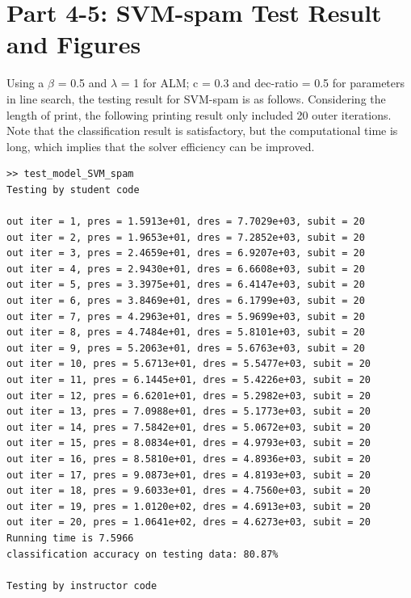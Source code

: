 \documentclass[12pt]{article}
\begin{document}
\section*{Part 4-5: SVM-spam Test Result and Figures}
$$
$$
Using a \(\beta\) = 0.5 and \(\lambda\) = 1 for ALM; c = 0.3 and dec-ratio = 0.5 for parameters in line search, the testing result for SVM-spam is as follows. Considering the length of print, the following printing result only included 20 outer iterations. Note that the classification result is satisfactory, but the computational time is long, which implies that the solver efficiency can be improved.
\begin{verbatim}
>> test_model_SVM_spam
Testing by student code

out iter = 1, pres = 1.5913e+01, dres = 7.7029e+03, subit = 20
out iter = 2, pres = 1.9653e+01, dres = 7.2852e+03, subit = 20
out iter = 3, pres = 2.4659e+01, dres = 6.9207e+03, subit = 20
out iter = 4, pres = 2.9430e+01, dres = 6.6608e+03, subit = 20
out iter = 5, pres = 3.3975e+01, dres = 6.4147e+03, subit = 20
out iter = 6, pres = 3.8469e+01, dres = 6.1799e+03, subit = 20
out iter = 7, pres = 4.2963e+01, dres = 5.9699e+03, subit = 20
out iter = 8, pres = 4.7484e+01, dres = 5.8101e+03, subit = 20
out iter = 9, pres = 5.2063e+01, dres = 5.6763e+03, subit = 20
out iter = 10, pres = 5.6713e+01, dres = 5.5477e+03, subit = 20
out iter = 11, pres = 6.1445e+01, dres = 5.4226e+03, subit = 20
out iter = 12, pres = 6.6201e+01, dres = 5.2982e+03, subit = 20
out iter = 13, pres = 7.0988e+01, dres = 5.1773e+03, subit = 20
out iter = 14, pres = 7.5842e+01, dres = 5.0672e+03, subit = 20
out iter = 15, pres = 8.0834e+01, dres = 4.9793e+03, subit = 20
out iter = 16, pres = 8.5810e+01, dres = 4.8936e+03, subit = 20
out iter = 17, pres = 9.0873e+01, dres = 4.8193e+03, subit = 20
out iter = 18, pres = 9.6033e+01, dres = 4.7560e+03, subit = 20
out iter = 19, pres = 1.0120e+02, dres = 4.6913e+03, subit = 20
out iter = 20, pres = 1.0641e+02, dres = 4.6273e+03, subit = 20
Running time is 7.5966
classification accuracy on testing data: 80.87%

Testing by instructor code


\end{verbatim}
\end{document}
